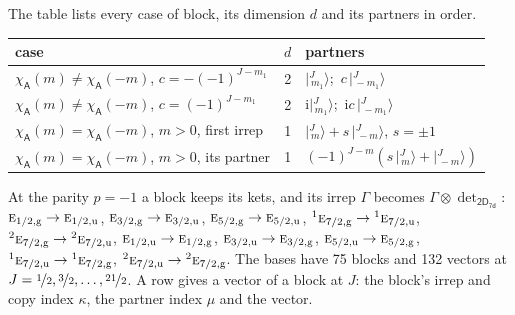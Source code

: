 \documentclass[10pt,a4paper]{article}
\numberwithin{equation}{section}
\newcommand{\grp}[1]{\mathsf{#1}}
\newcommand{\irr}[1]{\text{\normalfont\scshape #1}}
\newcommand{\conjpair}[1]{{}^{#1}}
\newcommand{\ptag}[1]{\mathrm{#1}}
\newcommand{\iunit}{\mathrm{i}}
\newcommand{\chiA}{\chi_{\grp{A}}}
\newcommand{\irrprod}{\otimes}
\newcommand{\mult}{\kappa}
\newcommand{\intx}{\mu}
\newcommand{\jm}[2]{\bigl\lvert{}^{#1}_{\,#2}\bigr\rangle}
\begin{document}
\leavevmode\label{n:head.case}\label{n:head.partners}The table lists every case of block, its dimension $d$ and its partners in order.
\begin{center}\begin{tabular}{@{}lrl@{}}\toprule
case & $d$ & partners\\\midrule
$\chiA(m) \ne \chiA(-m)$, $c = -(-1)^{J-m_1}$ & 2 & $\jm{J}{m_1}$;\ $c\,\jm{J}{-m_1}$\\
$\chiA(m) \ne \chiA(-m)$, $c = (-1)^{J-m_1}$ & 2 & $\iunit\jm{J}{m_1}$;\ $\iunit c\,\jm{J}{-m_1}$\\
$\chiA(m) = \chiA(-m)$, $m > 0$, first irrep & 1 & $\jm{J}{m} + s\,\jm{J}{-m}$, $s = \pm1$\\
$\chiA(m) = \chiA(-m)$, $m > 0$, its partner & 1 & $(-1)^{J-m}(s\,\jm{J}{m} + \jm{J}{-m})$\\
\bottomrule\end{tabular}\end{center}
At the parity $p = -1$ a block keeps its kets, and its irrep $\Gamma$ becomes $\Gamma \irrprod \det_{\grp{2D_{7d}}}$: $\irr{e}_{1/2,\ptag{g}} \to \irr{e}_{1/2,\ptag{u}}$, $\irr{e}_{3/2,\ptag{g}} \to \irr{e}_{3/2,\ptag{u}}$, $\irr{e}_{5/2,\ptag{g}} \to \irr{e}_{5/2,\ptag{u}}$, $\conjpair{1}\irr{e}_{7/2,\ptag{g}} \to \conjpair{1}\irr{e}_{7/2,\ptag{u}}$, $\conjpair{2}\irr{e}_{7/2,\ptag{g}} \to \conjpair{2}\irr{e}_{7/2,\ptag{u}}$, $\irr{e}_{1/2,\ptag{u}} \to \irr{e}_{1/2,\ptag{g}}$, $\irr{e}_{3/2,\ptag{u}} \to \irr{e}_{3/2,\ptag{g}}$, $\irr{e}_{5/2,\ptag{u}} \to \irr{e}_{5/2,\ptag{g}}$, $\conjpair{1}\irr{e}_{7/2,\ptag{u}} \to \conjpair{1}\irr{e}_{7/2,\ptag{g}}$, $\conjpair{2}\irr{e}_{7/2,\ptag{u}} \to \conjpair{2}\irr{e}_{7/2,\ptag{g}}$.
The bases have 75 blocks and 132 vectors at $J = \nicefrac{1}{2}, \nicefrac{3}{2}, \dots, \nicefrac{21}{2}$. \label{n:head.vector}A row gives a vector of a block at $J$: the block's irrep and copy index $\mult$, the partner index $\intx$ and the vector.
\end{document}
